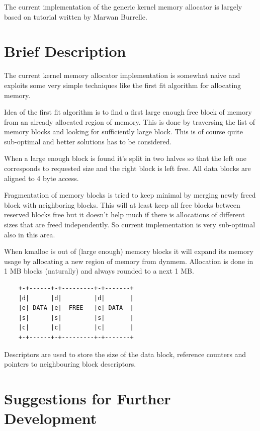 The current implementation of the generic kernel memory allocator is largely
based on tutorial written by Marwan Burrelle\cite{Burelle:malloc}.

\section{Brief Description}

The current kernel memory allocator implementation is somewhat naive and
exploits some very simple techniques like the first fit algorithm for allocating
memory.

Idea of the first fit algorithm is to find a first large enough free block of
memory from an already allocated region of memory. This is done by traversing
the list of memory blocks and looking for sufficiently large block. This is
of course quite sub-optimal and better solutions has to be considered.

When a large enough block is found it's split in two halves so that the left
one corresponds to requested size and the right block is left free. All data
blocks are aligned to 4 byte access.

Fragmentation of memory blocks is tried to keep minimal by merging newly freed
block with neighboring blocks. This will at least keep all free blocks between
reserved blocks free but it doesn't help much if there is allocations of
different sizes that are freed independently. So current implementation is very
sub-optimal also in this area.

When kmalloc is out of (large enough) memory blocks it will expand its memory
usage by allocating a new region of memory from dynmem. Allocation is done in
1 MB blocks (naturally) and always rounded  to a next 1 MB.

\begin{verbatim}
    +-+------+-+---------+-+-------+
    |d|      |d|         |d|       |
    |e| DATA |e|  FREE   |e| DATA  |
    |s|      |s|         |s|       |
    |c|      |c|         |c|       |
    +-+------+-+---------+-+-------+
\end{verbatim}

Descriptors are used to store the size of the data block, reference counters and
pointers to neighbouring block descriptors.


\section{Suggestions for Further Development}


